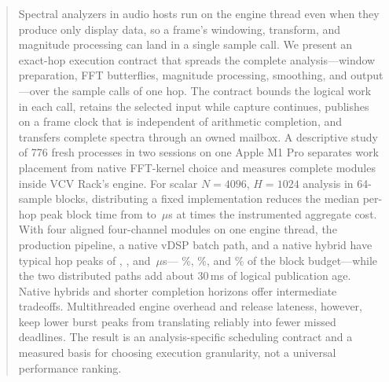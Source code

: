 \begin{abstract}
Spectral analyzers in audio hosts run on the engine thread even when they
produce only display data, so a frame's windowing, transform, and magnitude
processing can land in a single sample call. We present an exact-hop execution
contract that spreads the complete analysis---window preparation, FFT
butterflies, magnitude processing, smoothing, and output---over the sample
calls of one hop. The contract bounds the logical work in each call, retains
the selected input while capture continues, publishes on a frame clock that is
independent of arithmetic completion, and transfers complete spectra through
an owned mailbox. A descriptive study of 776 fresh processes in two sessions
on one Apple M1 Pro separates work placement from native FFT-kernel choice and
measures complete modules inside VCV Rack's engine. For scalar
$N=4096$, $H=1024$ analysis in 64-sample blocks, distributing a fixed
implementation reduces the median per-hop peak block time from
\StudyBatchPeak{} to \StudyCorePeak\,$\mu$s at \StudyPlacementCostRatio{}
times the instrumented aggregate cost. With four aligned four-channel modules
on one engine thread, the production pipeline, a native vDSP batch path, and a
native hybrid have typical hop peaks of \StudyHostCorePeak,
\StudyHostBatchPeak, and \StudyHostHybridPeak\,$\mu$s---%
\StudyHostCoreBudgetPercent\%, \StudyHostBatchBudgetPercent\%, and
\StudyHostHybridBudgetPercent\% of the block budget---while the two
distributed paths add about 30\,ms of logical publication age. Native hybrids
and shorter completion horizons offer intermediate tradeoffs. Multithreaded
engine overhead and release lateness, however, keep lower burst peaks from
translating reliably into fewer missed deadlines. The result is an
analysis-specific scheduling contract and a measured basis for choosing
execution granularity, not a universal performance ranking.
\end{abstract}
